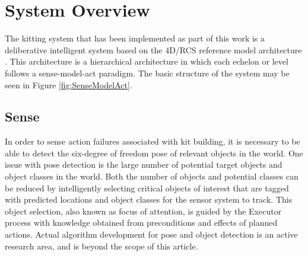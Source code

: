\section{System Overview}
\label{sect:overview}
The kitting system that has been implemented as part of this work is a deliberative intelligent system based on the 4D/RCS 
reference model architecture \cite{Albus2000}. This architecture is a hierarchical architecture in which each echelon or level
follows a sense-model-act paradigm. The basic structure of the system may be seen in Figure \ref{fig:SenseModelAct}.
%
\subsection{Sense}
\label{subsection:Sense}
In order to sense action failures associated with kit building, it is necessary to be able to detect the six-degree of freedom pose of relevant objects in the
world. One issue with pose detection is the large number of potential target objects and object classes in the world. 
Both the number of objects and potential classes can be reduced by intelligently
selecting critical objects of interest that are tagged with predicted locations and object classes for the sensor system to track. This object selection, 
also known as focus of attention, is guided by
the Executor process with knowledge obtained from preconditions and effects of planned actions.
Actual algorithm development for pose and object detection is an active research area, and is beyond the scope of this article. 

